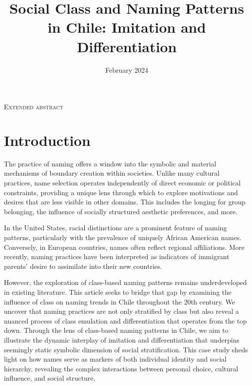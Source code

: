 





\title{Social Class and Naming Patterns in Chile: Imitation and Differentiation}
\subti
\author{}
\date{February 2024}


\maketitle

\begin{center}
    \textsc{Extended abstract} 
\end{center}

\section{Introduction}
The practice of naming offers a window into the symbolic and material mechanisms of boundary creation within societies. Unlike many cultural practices, name selection operates independently of direct economic or political constraints, providing a unique lens through which to explore motivations and desires that are less visible in other domains. This includes the longing for group belonging, the influence of socially structured aesthetic preferences, and more.
 \bigskip 

In the United States, racial distinctions are a prominent feature of naming patterns, particularly with the prevalence of uniquely African American names. Conversely, in European countries, names often reflect regional affiliations. More recently, naming practices have been interpreted as indicators of immigrant parents' desire to assimilate into their new countries.
 \bigskip 

However, the exploration of class-based naming patterns remains underdeveloped in existing literature. This article seeks to bridge that gap by examining the influence of class on naming trends in Chile throughout the 20th century. We uncover that naming practices are not only stratified by class but also reveal a nuanced process of class emulation and differentiation that operates from the top down. Through the lens of class-based naming patterns in Chile, we aim to illustrate the dynamic interplay of imitation and differentiation that underpins seemingly static symbolic dimension of social stratification. This case study sheds light on how names serve as markers of both individual identity and social hierarchy, revealing the complex interactions between personal choice, cultural influence, and social structure.
 \bigskip
 

